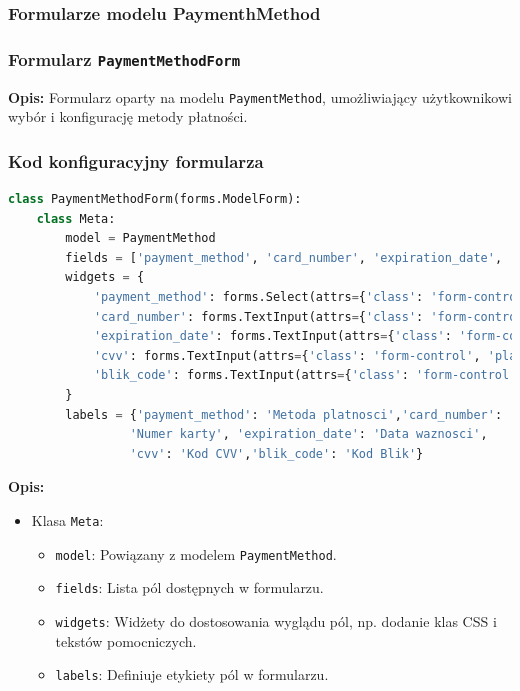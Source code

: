 \documentclass[12pt,a4paper,oneside]{article}
\theoremstyle{definition}
\numberwithin{equation}{section}
\begin{document}
\subsubsection{Formularze modelu PaymenthMethod}

\subsubsection*{Formularz \texttt{PaymentMethodForm}}
\textbf{Opis:}
Formularz oparty na modelu \texttt{PaymentMethod}, umożliwiający użytkownikowi wybór i konfigurację metody płatności.

\subsubsection*{Kod konfiguracyjny formularza}
\begin{lstlisting}[language=Python, caption=Konfiguracja formularza]
class PaymentMethodForm(forms.ModelForm):
    class Meta:
        model = PaymentMethod
        fields = ['payment_method', 'card_number', 'expiration_date', 'cvv', 'blik_code']
        widgets = {
            'payment_method': forms.Select(attrs={'class': 'form-control'}),
            'card_number': forms.TextInput(attrs={'class': 'form-control', 'placeholder': 'Wprowadz numer karty'}),
            'expiration_date': forms.TextInput(attrs={'class': 'form-control', 'placeholder': 'MM/RR'}),
            'cvv': forms.TextInput(attrs={'class': 'form-control', 'placeholder': 'CVV'}),
            'blik_code': forms.TextInput(attrs={'class': 'form-control', 'placeholder': 'Kod Blik'}),
        }
        labels = {'payment_method': 'Metoda platnosci','card_number':
                 'Numer karty', 'expiration_date': 'Data waznosci',
                 'cvv': 'Kod CVV','blik_code': 'Kod Blik'}
\end{lstlisting}

\textbf{Opis:}
\begin{itemize}
    \item Klasa \texttt{Meta}:
    \begin{itemize}
        \item \texttt{model}: Powiązany z modelem \texttt{PaymentMethod}.
        \item \texttt{fields}: Lista pól dostępnych w formularzu.
        \item \texttt{widgets}: Widżety do dostosowania wyglądu pól, np. dodanie klas CSS i tekstów pomocniczych.
        \item \texttt{labels}: Definiuje etykiety pól w formularzu.
    \end{itemize}
\end{itemize}
\end{document}
